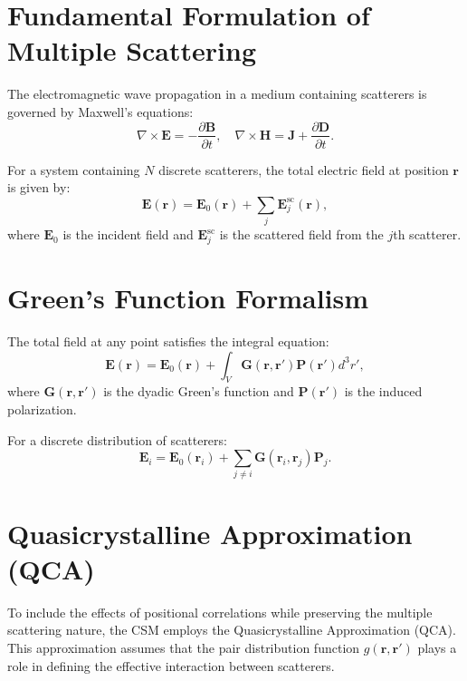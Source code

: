 \documentclass{article}
\begin{document}
	\section{Fundamental Formulation of Multiple Scattering}
	The electromagnetic wave propagation in a medium containing scatterers is governed by Maxwell's equations:
	\begin{equation}
		\nabla \times \mathbf{E} = -\frac{\partial \mathbf{B}}{\partial t}, \quad
		\nabla \times \mathbf{H} = \mathbf{J} + \frac{\partial \mathbf{D}}{\partial t}.
	\end{equation}
	
	For a system containing $N$ discrete scatterers, the total electric field at position $\mathbf{r}$ is given by:
	\begin{equation}
		\mathbf{E} (\mathbf{r}) = \mathbf{E}_0(\mathbf{r}) + \sum_{j} \mathbf{E}_j^{\text{sc}}(\mathbf{r}),
	\end{equation}
	where $\mathbf{E}_0$ is the incident field and $\mathbf{E}_j^{\text{sc}}$ is the scattered field from the $j$th scatterer.
	
	\section{Green's Function Formalism}
	The total field at any point satisfies the integral equation:
	\begin{equation}
		\mathbf{E}(\mathbf{r}) = \mathbf{E}_0(\mathbf{r}) + \int_V \mathbf{G}(\mathbf{r}, \mathbf{r'}) \mathbf{P}(\mathbf{r'}) d^3 r',
	\end{equation}
	where $\mathbf{G}(\mathbf{r}, \mathbf{r'})$ is the dyadic Green’s function and $\mathbf{P}(\mathbf{r'})$ is the induced polarization.
	
	For a discrete distribution of scatterers:
	\begin{equation}
		\mathbf{E}_i = \mathbf{E}_0(\mathbf{r}_i) + \sum_{j \neq i} \mathbf{G}(\mathbf{r}_i, \mathbf{r}_j) \mathbf{P}_j.
	\end{equation}
	
	\section{Quasicrystalline Approximation (QCA)}
	To include the effects of positional correlations while preserving the multiple scattering nature, the CSM employs the Quasicrystalline Approximation (QCA). This approximation assumes that the pair distribution function $g(\mathbf{r}, \mathbf{r'})$ plays a role in defining the effective interaction between scatterers.
	
\end{document}
